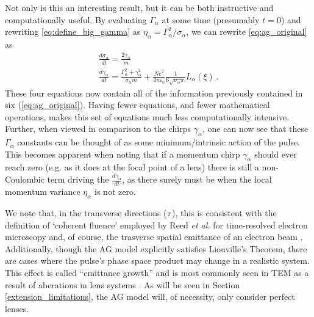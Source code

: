 Not only is this an interesting result, but it can be both instructive and computationally useful.
By evaluating $\Gamma_{\alpha}$ at some time (presumably $t=0$) and rewriting \ref{eq:define_big_gamma} as $\eta_{\alpha} = \Gamma_{\alpha}^2 / \sigma_{\alpha}$, we can rewrite \ref{eq:ag_original} as 
\begin{subequations} \label{eq:ag_big_gamma}
\begin{gather}
  \frac{d\sigma_{\alpha}}{dt} = \frac{2\gamma_{\alpha}}{m} \\
  \frac{d\gamma_{\alpha}}{dt} = \frac{ \Gamma_{\alpha}^2 + \gamma_{\alpha}^2 }{\sigma_{\alpha} m}
    + \frac{N e^2}{4\pi\varepsilon_0} \frac{1}{6 \sqrt{\sigma_{\alpha}\pi}} L_{\alpha}(\xi) \, \text{.} \label{eq:ag_big_gamma_gamma}
\end{gather}
\end{subequations}
These four equations now contain all of the information previously contained in six (\ref{eq:ag_original}).
Having fewer equations, and fewer mathematical operations, makes this set of equations much less computationally intensive.
Further, when viewed in comparison to the chirps $\gamma_{\alpha}$, one can now see that these $\Gamma_{\alpha}$ constants can be thought of as some minimum/intrinsic action of the pulse.
This becomes apparent when noting that if a momentum chirp $\gamma_{\alpha}$ should ever reach zero (e.g. as it does at the focal point of a lens) there is still a non-Coulombic term driving the $\frac{d\gamma_{\alpha}}{dt}$, as there surely must be when the local momentum variance $\eta_{\alpha}$ is not zero.

We note that, in the transverse directions (${\scriptscriptstyle T}$), this is consistent with the definition of `coherent fluence' employed by Reed \textit{et al.} \cite{reed_evolution_2009} for time-resolved electron microscopy and, of course, the trasverse spatial emittance of an electron beam \cite{jensen_theoretical_2006,siwick_ultrafast_2002}.
Additionally, though the AG model explicitly satisfies Liouville's Theorem, there are cases where the pulse's phase space product may change in a realistic system.
This effect is called ``emittance growth'' and is most commonly seen in TEM as a result of aberations in lens systems \cite{oshea_reversible_1998}.
As will be seen in Section \ref{extension_limitations}, the AG model will, of necessity, only consider perfect lenses.

